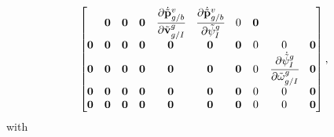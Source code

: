 \begin{align}
\begin{bmatrix}
               & \vect{0} & \vect{0} & \vect{0} & 
      \cfrac{ \partial \dot{\tilde{\vect{p}}}_{g/b}^{v} }{ \partial \tilde{\vect{v}}_{g/I}^{g} }
               &
      \cfrac{ \partial \dot{\tilde{\vect{p}}}_{g/b}^{v} }{ \partial \tilde{\psi}_{I}^{g} }
               & 0 & \vect{0} \\
      \vect{0} & \vect{0} & \vect{0} & \vect{0} & \vect{0} & \vect{0} & \vect{0}
               & 0 & 0 & \vect{0} \\
      \vect{0} & \vect{0} & \vect{0} & \vect{0} & \vect{0} & \vect{0} & \vect{0}
               & 0 & 
               \cfrac{ \partial \dot{\tilde{\psi}}_{I}^{g} }{ \partial \tilde{\omega}_{g/I}^{g} }
               & \vect{0} \\
      \vect{0} & \vect{0} & \vect{0} & \vect{0} & \vect{0} & \vect{0} & \vect{0}
               & 0 & 0 & \vect{0} \\
      \vect{0} & \vect{0} & \vect{0} & \vect{0} & \vect{0} & \vect{0} & \vect{0}
               & 0 & 0 & \vect{0}
    \end{bmatrix},
\end{align}
with
